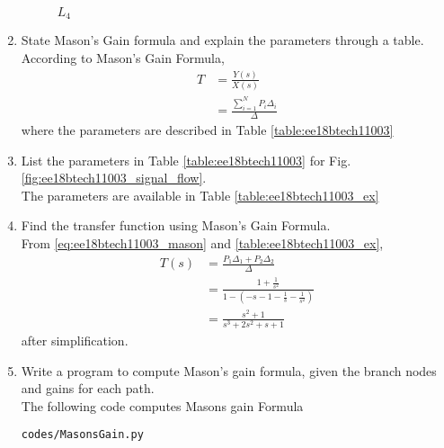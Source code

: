 \begin{enumerate}[label=\thesection.\arabic*.,ref=\thesection.\theenumi]
\begin{figure}[!ht]
\begin{center}
		\resizebox{\columnwidth}{!}{}
	\end{center}
\caption{$L_4$}
\label{fig:ee18btech11003_L4}
\end{figure}

\renewcommand{\thefigure}{\theenumi}

\item State Mason's Gain formula and explain the parameters through a table.
\\
\solution 
According to Mason's Gain Formula,
\begin{align}
T &= \frac{Y(s)}{X(s)} 
\\
 &= \frac{\sum_{i=1}^{N} P_i\Delta_i}{\Delta}
\label{eq:ee18btech11003_mason}
\end{align}
%
where the parameters are described in Table \ref{table:ee18btech11003}
\begin{table}[!ht]
\centering

\caption{}
\label{table:ee18btech11003}
\end{table}
\item List the parameters in Table \ref{table:ee18btech11003}
for Fig. \ref{fig:ee18btech11003_signal_flow}.
\\
\solution The parameters are available in Table \ref{table:ee18btech11003_ex}

\begin{table}[!ht]
\centering

\caption{}
\label{table:ee18btech11003_ex}
\end{table}

\item  Find the transfer function using Mason's Gain Formula.
\renewcommand{\thefigure}{\theenumi.\arabic{figure}}
%
\\
\solution From \eqref{eq:ee18btech11003_mason} and \ref{table:ee18btech11003_ex},
\begin{align}
T(s)&=\frac{P_1 \Delta_1+P_2 \Delta_2}{\Delta}
\\
&=\frac{1 +\frac{1}{s^2}}{1-(-s-1-\frac{1}{s}-\frac{1}{s^2})}
\\
&=\frac{s^2+1}{s^3+2s^2+s+1}
\end{align}
%
after simplification.
\renewcommand{\thefigure}{\theenumi}
\item Write a program to compute Mason's gain formula, given the branch nodes and gains for each path.
\\
\solution The following code computes Masons gain Formula 
%
\begin{lstlisting}
codes/MasonsGain.py
\end{lstlisting}
\end{enumerate}